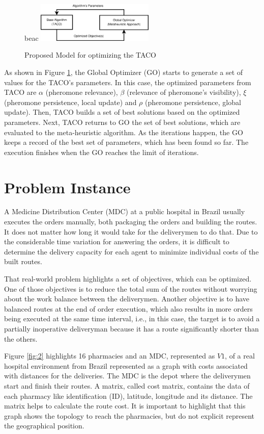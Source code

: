 \documentclass[runningheads]{llncs}
\begin{document}
\begin{figure}
  beac   \centering
    \includegraphics[width=0.5\textwidth]{Diagram1.eps}
    \caption{Proposed Model for optimizing the TACO} \label{fig:1}
\end{figure}

As shown in Figure \ref{fig:1}, the Global Optimizer (GO) starts to generate a set of values for the TACO’s parameters. In this case, the optimized parameters from TACO are $\alpha$ (pheromone relevance), $\beta$ (relevance of pheromone’s visibility), $\xi$ (pheromone persistence, local update) and $\rho$ (pheromone persistence, global update). Then, TACO builds a set of best solutions based on the optimized parameters. Next, TACO returns to GO the set of best solutions, which are evaluated to the meta-heuristic algorithm. As the iterations happen, the GO keeps a record of the best set of parameters, which has been found so far. The execution finishes when the GO reaches the limit of iterations.

\section{Problem Instance}
A Medicine Distribution Center (MDC) at a public hospital in Brazil usually executes the orders manually, both packaging the orders and building the routes. It does not matter how long it would take for the deliverymen to do that. Due to the considerable time variation for answering the orders, it is difficult to determine the delivery capacity for each agent to minimize individual costs of the built routes.

That real-world problem highlights a set of objectives, which can be optimized. One of those objectives is to reduce the total sum of the routes without worrying about the work balance between the deliverymen. Another objective is to have balanced routes at the end of order execution, which also results in more orders being executed at the same time interval, i.e., in this case, the target is to avoid a partially inoperative deliveryman because it has a route significantly shorter than the others.

Figure \ref{fig:2} highlights 16 pharmacies and an MDC, represented as \(V1\),  of a real hospital environment from Brazil represented as a graph with costs associated with distances for the deliveries. The MDC is the depot where the deliverymen start and finish their routes. A matrix, called cost matrix, contains the data of each pharmacy like identification (ID), latitude, longitude and its distance. The matrix helps to calculate the route cost. It is important to highlight that this graph shows the topology to reach the pharmacies, but do not explicit represent the geographical position.
\end{document}
